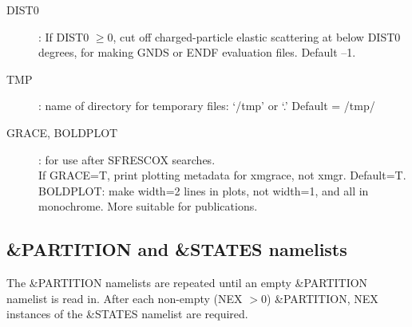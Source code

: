 \documentclass[11pt]{article}
\begin{document}
\begin{description}
\item[DIST0] :
If DIST0 $\geq 0$, cut off charged-particle elastic scattering at below DIST0 degrees, for making GNDS or ENDF evaluation files. Default --1.

\item[TMP]:  name of directory for temporary files: `/tmp' or `.'  Default = /tmp/

\item[GRACE, BOLDPLOT] : for use after SFRESCOX searches.\\
If GRACE=T, print plotting metadata for xmgrace, not xmgr. Default=T.\\
BOLDPLOT: make width=2 lines in plots, not width=1, and all in monochrome. More suitable for publications.

\end{description}


\subsection{\&PARTITION and \&STATES namelists}
%
The \&PARTITION namelists are repeated until an empty \&PARTITION namelist is read in.
After each non-empty (NEX $> 0$) \&PARTITION, NEX instances of the \&STATES namelist are required.
\end{document}
